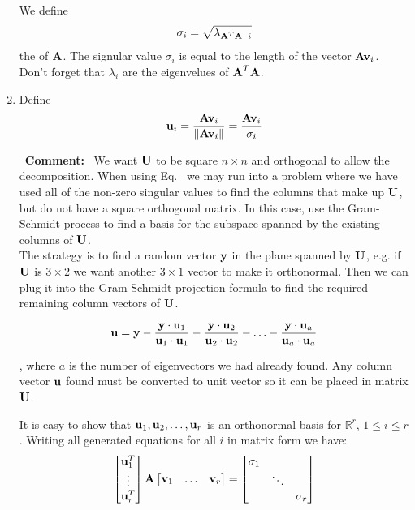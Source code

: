 \documentclass[a4paper]{article}
\numberwithin{equation}{section} %
\newcommand{\setR}{\mathbb{R}} %
\newcommand{\norm}[1] {\lVert #1 \rVert} %
\newcommand{\hquad}{\hskip0.5em\relax}%
\newcommand{\B}[1]{\textbf{\textup{#1}}} %
\newcommand{\bup}[1]{\textbf{\textup{#1}}} %
\newcommand{\emphasis}[1]{\textls{#1}}
\renewcommand{\eqref}{Eq.~\originaleqref}
\renewcommand*{\eqref}[1]{Eq.~\originaleqref{#1}}
\newcommand{\mycomment}[1]{\begin{leftrightbox}\Pointinghand~\textbf{Comment:}~#1 \end{leftrightbox}}
\begin{document}
\begin{enumerate}
We define 
\begin{equation}
\sigma_i = \sqrt{\lambda_{\B{A}^T\B{A}\hquad i}}
\end{equation}
the \emphasis{singular values} of $\B{A}$. The signular value $\sigma_i$ is equal to the length of the vector $\B{Av}_i$. Don't forget that $\lambda_i$ are the eigenvelues of $\B{A}^T\B{A}$.
\item Define
\begin{equation}
\B{u}_i = \frac{\B{Av}_i}{\norm{\B{Av}_i}}=\frac{\B{Av}_i}{\sigma_i}
\label{eq:svd_ui_vector}
\end{equation}
\mycomment{\cite{pres_bingham} We want $\B{U}$ to be square $n \times n$ and orthogonal to allow the decomposition. When using \eqref{eq:svd_ui_vector} we may run into a problem where we have used all of the non-zero singular values to find the columns that make up $\B{U}$, but do not have a square orthogonal matrix.  In this case, use the Gram-Schmidt process to find a basis for the subspace spanned by the existing columns of $\B{U}$.\\
The strategy is to find a random vector $\B{y}$ in the plane spanned by $\B{U}$, e.g. if $\B{U}$ is $3\times 2$ we want another $3 \times 1$ vector to make it orthonormal.  Then  we can plug it into the Gram-Schmidt projection  formula  to  find  the required remaining column vectors of $\B{U}$. } %
\begin{equation}
\bup{u} = \bup{y} - \frac{\B{y}\cdot\B{u}_1}{\B{u}_1\cdot \B{u}_1} - \frac{\B{y}\cdot\B{u}_2}{\B{u}_2\cdot \B{u}_2} - \ldots - \frac{\B{y}\cdot\B{u}_a}{\B{u}_a\cdot \B{u}_a}
\label{eq:svd_gs}
\end{equation}
\begin{leftrightbox} %
, where $a$ is the number of eigenvectors we had already found. Any column vector $\B{u}$ found must be converted to unit vector so it can be placed in matrix $\B{U}$.
\end{leftrightbox}
It is easy to show that $\B{u}_1,\B{u}_2,\ldots,\B{u}_r$ is an orthonormal basis for $\setR^r$, $1 \leq i \leq r$. Writing all generated equations for all $i$ in matrix form we have:
\[
\begin{bmatrix} \B{u}_1^T \\ \vdots \\ \B{u}_r^T \end{bmatrix}
\B{A}
\begin{bmatrix} \B{v}_1 & \ldots & \B{v}_r \end{bmatrix} = 
\begin{bmatrix} \sigma_1 & & \\ & \ddots & \\ & & \sigma_r\end{bmatrix}
\]
\end{enumerate}
\end{document}
